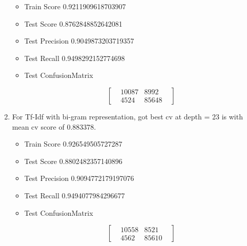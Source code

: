 \documentclass[11pt]{article}
\providecommand{\tightlist}{%
      \setlength{\itemsep}{0pt}\setlength{\parskip}{0pt}}
\begin{document}
\begin{enumerate}
  \begin{itemize}
  \tightlist
  \item
    Train Score 0.9211909618703907
  \item
    Test Score 0.8762848852642081
  \item
    Test Precision 0.9049873203719357
  \item
    Test Recall 0.9498292152774698
  \item
    Test ConfusionMatrix

    \begin{equation}
    \begin{bmatrix}
    & 10087 & 8992 &  \\
    & 4524 & 85648 & 
    \end{bmatrix}
    \end{equation}
  \end{itemize}
\item
  For Tf-Idf with bi-gram representation, got best cv at depth = 23 is
  with mean cv score of 0.883378.

  \begin{itemize}
  \tightlist
  \item
    Train Score 0.926549505727287
  \item
    Test Score 0.8802482357140896
  \item
    Test Precision 0.9094772179197076
  \item
    Test Recall 0.9494077984296677
  \item
    Test ConfusionMatrix

    \begin{equation}
    \begin{bmatrix}
    & 10558 & 8521 &  \\
    & 4562 & 85610 & 
    \end{bmatrix}
    \end{equation}
  \end{itemize}
\end{enumerate}


    
    
    
    
\end{document}
